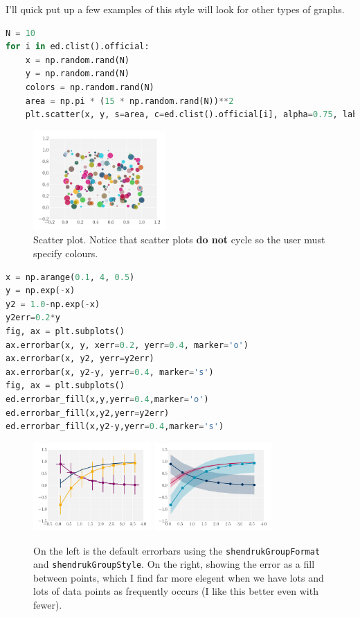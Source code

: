 \documentclass[10pt,a4paper]{article}
\begin{document}
\newpage

I'll quick put up a few examples of this style will look for other types of graphs.

\begin{lstlisting}[language=Python]
N = 10
for i in ed.clist().official:
    x = np.random.rand(N)
    y = np.random.rand(N)
    colors = np.random.rand(N)
    area = np.pi * (15 * np.random.rand(N))**2
    plt.scatter(x, y, s=area, c=ed.clist().official[i], alpha=0.75, label=i)
\end{lstlisting}
\begin{figure}[h]
  \centering
  \includegraphics[width=0.45\textwidth]{scatter.pdf}
  \caption{Scatter plot. Notice that scatter plots \textbf{do not} cycle so the user must specify colours.}
\end{figure}

\begin{lstlisting}[language=Python]
x = np.arange(0.1, 4, 0.5)
y = np.exp(-x)
y2 = 1.0-np.exp(-x)
y2err=0.2*y
fig, ax = plt.subplots()
ax.errorbar(x, y, xerr=0.2, yerr=0.4, marker='o')
ax.errorbar(x, y2, yerr=y2err)
ax.errorbar(x, y2-y, yerr=0.4, marker='s')
fig, ax = plt.subplots()
ed.errorbar_fill(x,y,yerr=0.4,marker='o')
ed.errorbar_fill(x,y2,yerr=y2err)
ed.errorbar_fill(x,y2-y,yerr=0.4,marker='s')
\end{lstlisting}
\begin{figure}[h]
  \centering
  \includegraphics[width=0.4\textwidth]{errorbar.pdf}
  \includegraphics[width=0.4\textwidth]{errorfill.pdf}
  \caption{On the left is the default errorbars using the \texttt{shendrukGroupFormat} and \texttt{shendrukGroupStyle}. On the right, showing the error as a fill between points, which I find far more elegent when we have lots and lots of data points as frequently occurs (I like this better even with fewer).}
\end{figure}
\end{document}
